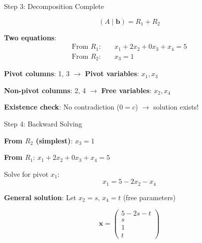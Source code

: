 \documentclass[10pt]{beamer}
\theoremstyle{definition}
\newcommand{\x}[1]{\alert{\textbf{#1}}}
\begin{document}
\begin{frame}{Step 3: Decomposition Complete}

$$(A \mid \mathbf{b}) = R_1 + R_2$$

\vspace{0.5em}

\x{Two equations}:
\begin{align*}
\text{From } R_1: & \quad x_1 + 2x_2 + 0x_3 + x_4 = 5 \\
\text{From } R_2: & \quad x_3 = 1
\end{align*}

\vspace{0.5em}

\x{Pivot columns}: 1, 3 $\to$ \textbf{Pivot variables}: $x_1, x_3$

\x{Non-pivot columns}: 2, 4 $\to$ \textbf{Free variables}: $x_2, x_4$

\vspace{0.5em}

\x{Existence check}: No contradiction ($0 = c$) $\to$ solution exists!

\end{frame}

\begin{frame}{Step 4: Backward Solving}

\x{From $R_2$ (simplest)}: $x_3 = 1$

\vspace{1em}

\x{From $R_1$}: $x_1 + 2x_2 + 0x_3 + x_4 = 5$

Solve for pivot $x_1$:
$$x_1 = 5 - 2x_2 - x_4$$

\vspace{1em}

\x{General solution}: Let $x_2 = s$, $x_4 = t$ (free parameters)

$$\mathbf{x} = \begin{pmatrix} 5 - 2s - t \\ s \\ 1 \\ t \end{pmatrix}$$

\end{frame}
\end{document}
